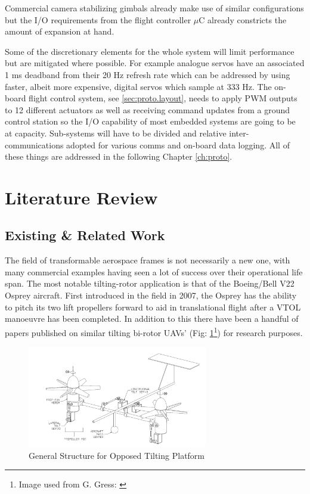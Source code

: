 Commercial camera stabilizing gimbals already make use of similar configurations but the I/O requirements from the flight controller $\mu$C already constricts the amount of expansion at hand.
\par
Some of the discretionary elements for  the whole system will limit performance but are mitigated where possible. For example analogue servos have an associated 1 ms deadband from their 20 Hz refresh rate which can be addressed by using faster, albeit more expensive, digital servos which sample at 333 Hz. The on-board flight control system, see \ref{sec:proto.layout}, needs to apply PWM outputs to 12 different actuators as well as receiving command updates from a ground control station so the I/O capability of most embedded systems are going to be at capacity. Sub-systems will have to be divided and relative inter-communications adopted for various comms and on-board data logging. All of these things are addressed in the following Chapter \ref{ch:proto}.
\section{Literature Review}
\label{sec:intro.litreview}
\subsection{Existing \& Related Work}
\label{subsec:intro.lit.related}
The field of transformable aerospace frames is not necessarily a new one, with many commercial examples having seen a lot of success over their operational life span. The most notable tilting-rotor application is that of the Boeing/Bell V22 Osprey aircraft. First introduced in the field in 2007, the Osprey has the ability to pitch its two lift propellers forward to aid in translational flight after a VTOL manoeuvre has been completed. In addition to this there have been a handful of papers published on similar tilting bi-rotor UAVs' (Fig: \ref{fig:dualaxistilt}\footnote{Image used from G. Gress: \cite{gres2007}}) for research purposes.
\begin{figure}[hbtp]
\centering
\includegraphics[width=0.7\textwidth]{figs/dualaxistilt}
\caption{General Structure for Opposed Tilting Platform}
\label{fig:dualaxistilt}
\end{figure}
